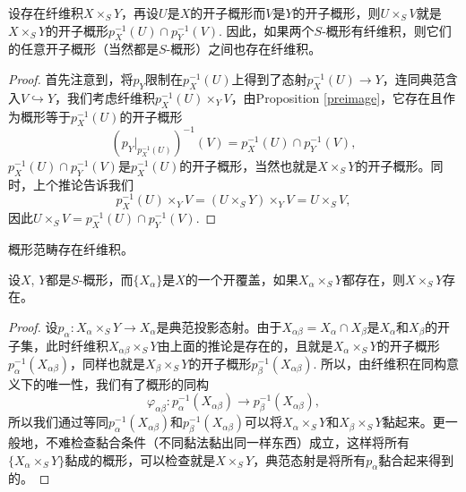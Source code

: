 
\begin{coro}\label{coro:3.2.8}
设存在纤维积$X\times_S Y$，再设$U$是$X$的开子概形而$V$是$Y$的开子概形，则$U\times_S V$就是$X\times_S Y$的开子概形$p_X^{-1}(U)\cap p_Y^{-1}(V)$. 因此，如果两个$S$-概形有纤维积，则它们的任意开子概形（当然都是$S$-概形）之间也存在纤维积。
\end{coro}

\begin{proof}
首先注意到，将$p_Y$限制在$p_X^{-1}(U)$上得到了态射$p_X^{-1}(U)\to Y$，连同典范含入$V\hookrightarrow Y$，我们考虑纤维积$p_X^{-1}(U)\times_Y V$，由Proposition \ref{preimage}，它存在且作为概形等于$p_X^{-1}(U)$的开子概形
\[
	\left(p_Y|_{p_X^{-1}(U)}\right)^{-1}(V)=p_X^{-1}(U)\cap p_Y^{-1}(V),
\]
$p_X^{-1}(U)\cap p_Y^{-1}(V)$是$p_X^{-1}(U)$的开子概形，当然也就是$X\times_S Y$的开子概形。同时，上个推论告诉我们
\[
	p_X^{-1}(U)\times_Y V=(U\times_S Y)\times_Y V=U\times_S V,
\]
因此$U\times_S V=p_X^{-1}(U)\cap p_Y^{-1}(V)$. 
\end{proof}


\begin{thm}[纤维积的存在性]\label{thm:1.5.9}
概形范畴存在纤维积。
\end{thm}

\begin{lem}\label{lem:3.2.10}
设$X$, $Y$都是$S$-概形，而$\{X_\alpha\}$是$X$的一个开覆盖，如果$X_\alpha\times_S Y$都存在，则$X\times_S Y$存在。
\end{lem}

\begin{proof}
设$p_\alpha:X_\alpha\times_S Y\to X_\alpha$是典范投影态射。由于$X_{\alpha\beta}=X_{\alpha}\cap X_{\beta}$是$X_{\alpha}$和$X_{\beta}$的开子集，此时纤维积$X_{\alpha\beta}\times_S Y$由上面的推论是存在的，且就是$X_\alpha\times_S Y$的开子概形$p_\alpha^{-1}(X_{\alpha\beta})$，同样也就是$X_\beta\times_S Y$的开子概形$p_\beta^{-1}(X_{\alpha\beta})$. 所以，由纤维积在同构意义下的唯一性，我们有了概形的同构
\[
	\varphi_{\alpha\beta}:p_\alpha^{-1}(X_{\alpha\beta})\to p_\beta^{-1}(X_{\alpha\beta}),
\]
所以我们通过等同$p_\alpha^{-1}(X_{\alpha\beta})$和$p_\beta^{-1}(X_{\alpha\beta})$可以将$X_\alpha\times_S Y$和$X_\beta\times_S Y$黏起来。更一般地，不难检查黏合条件（不同黏法黏出同一样东西）成立，这样将所有$\{X_\alpha\times_S Y\}$黏成的概形，可以检查就是$X\times_S Y$，典范态射是将所有$p_\alpha$黏合起来得到的。
\end{proof}

